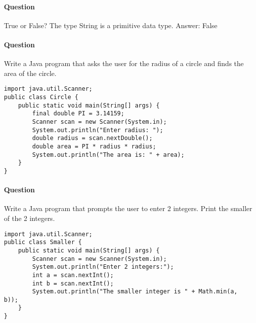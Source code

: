 \documentclass{article}
\begin{document}
\paragraph{Question }
True or False? The type String is a primitive data type.
{\color{red}Answer: False}

\addtocounter{question_num}{1}
\paragraph{Question }
Write a Java program that asks the user for the radius of a circle and finds the area of the circle.
\begin{lstlisting}
import java.util.Scanner;
public class Circle {
	public static void main(String[] args) {
		final double PI = 3.14159;
		Scanner scan = new Scanner(System.in);
		System.out.println("Enter radius: ");
		double radius = scan.nextDouble();
		double area = PI * radius * radius;
		System.out.println("The area is: " + area);
	}
}
\end{lstlisting}

\addtocounter{question_num}{1}
\paragraph{Question }
Write a Java program that prompts the user to enter 2 integers. Print the smaller of the 2 integers.
\begin{lstlisting}
import java.util.Scanner;
public class Smaller {
	public static void main(String[] args) {
		Scanner scan = new Scanner(System.in);
		System.out.println("Enter 2 integers:");
		int a = scan.nextInt();
		int b = scan.nextInt();
		System.out.println("The smaller integer is " + Math.min(a, b));
	}
}
\end{lstlisting}

\addtocounter{question_num}{1}
\end{document}
